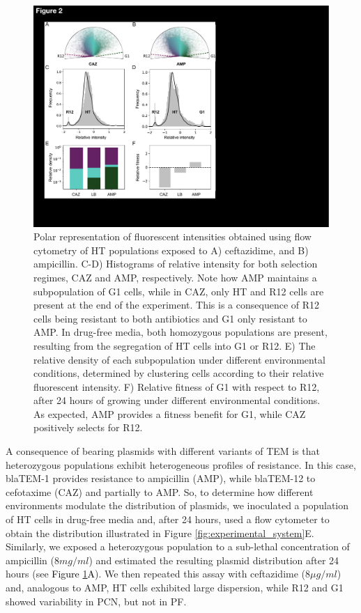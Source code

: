 \documentclass[fleqn,12pt]{wlscirep}
\newcommand{\fig}[1]{\textcolor{black}{#1}}
\begin{document}
\begin{figure}[ht!]
\centering
\includegraphics[width=.66\linewidth]{figures/Figure2.pdf}
\caption{ \small{ Polar representation of fluorescent intensities obtained using flow cytometry of HT populations exposed to A) ceftazidime, and B) ampicillin.  C-D) Histograms of relative intensity for both selection regimes, CAZ and AMP, respectively.  Note how AMP maintains a subpopulation of G1 cells, while in CAZ, only HT and R12 cells are present at the end of the experiment. This is a consequence of R12 cells being resistant to both antibiotics and G1 only resistant to AMP. In drug-free media, both homozygous populations are present, resulting from the segregation of HT cells into G1 or R12. E) The relative density of each subpopulation under different environmental conditions, determined by clustering cells according to their relative fluorescent intensity. F) Relative fitness of G1 with respect to R12, after 24 hours of growing under different environmental conditions. As expected, AMP provides a fitness benefit for G1, while CAZ positively selects for R12. }}
\label{fig:AMNIS}
\end{figure}

A consequence of bearing plasmids with different variants of TEM is that heterozygous populations exhibit heterogeneous profiles of resistance.  In this case, blaTEM-1 provides resistance to ampicillin (AMP), while blaTEM-12 to cefotaxime (CAZ) and partially to AMP\cite{Rodriguez2018, mroczkowska2008fitness}. 
So, to determine how different environments modulate the distribution of plasmids, we inoculated a population of HT cells in drug-free media and, after 24 hours, used a flow cytometer to obtain the distribution illustrated in Figure \ref{fig:experimental_system}E.
Similarly, we exposed a heterozygous population to a sub-lethal concentration of ampicillin ($8 mg/ml$) and estimated the resulting plasmid distribution after 24 hours (see \fig{Figure \ref{fig:AMNIS}A}). We then repeated this assay with ceftazidime ($8 \mu g/ml$) and, analogous to AMP,  HT cells exhibited large dispersion, while R12 and G1 showed variability in PCN, but not in PF. 
\end{document}
